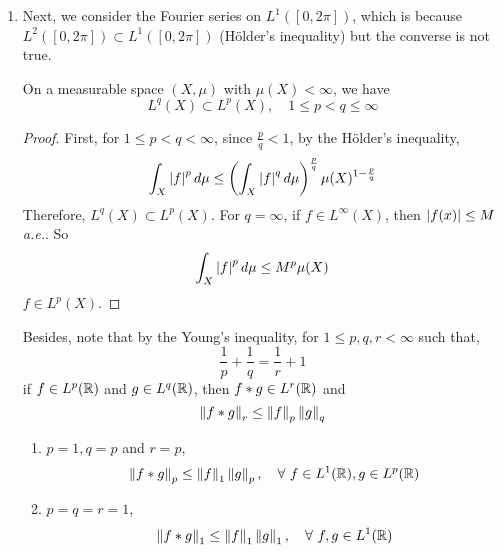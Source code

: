 \begin{enumerate}[label=\arabic*.]
	\item Next, we consider the Fourier series on $L^1([0,2\pi])$, which is because $L^2([0,2\pi])\subset L^1([0,2\pi])$ (H\"older's inequality) but the converse is not true.
	\begin{rmk}
		On a measurable space $(X,\mu)$ with $\mu(X) < \infty$, we have
		\begin{equation*}
			L^q(X) \subset L^p(X),\quad 1\leq p < q \leq \infty
		\end{equation*}
		\begin{proof}
			First, for $1\leq p < q < \infty$, since $\frac{p}{q} < 1$, by the H\"older's inequality,
			\begin{equation*}
				\int_X \left\lvert f\right\lvert^p d\mu \leq \left(\int_X \left\lvert f\right\lvert^q d\mu\right)^{\frac{p}{q}}\mu(X)^{1-\frac{p}{q}}
			\end{equation*}
			Therefore, $L^q(X) \subset L^p(X)$.
			For $q = \infty$, if $f \in L^\infty(X)$, then $\left\lvert f(x)\right\lvert \leq M$ \emph{a.e.}. So
			\begin{equation*}
				\int_X \left\lvert f\right\lvert^p d\mu \leq M^p\mu(X)
			\end{equation*}
			$f \in L^p(X)$.
		\end{proof}
	\end{rmk}
	Besides, note that by the Young's inequality, for $1 \leq p,q,r < \infty$ such that,
	\begin{equation*}
		\frac{1}{p} + \frac{1}{q} = \frac{1}{r} + 1
	\end{equation*}
	if $f \in L^p(\mathbb{R})$ and $g \in L^q(\mathbb{R})$, then $f * g \in L^r(\mathbb{R})$ and
	\begin{equation*}
		\left\lVert f * g\right\lVert_r \leq \left\lVert f\right\lVert_p\left\lVert g\right\lVert_q
	\end{equation*}
	\begin{enumerate}[label=(\arabic*)]
		\item $p = 1, q=p$ and $r = p$,
		\begin{equation*}
			\left\lVert f * g\right\lVert_p \leq \left\lVert f\right\lVert_1\left\lVert g\right\lVert_p,\quad \forall~ f \in L^1(\mathbb{R}),g \in L^p(\mathbb{R})
		\end{equation*}
		\item $p=q=r=1$,
		\begin{equation*}
			\left\lVert f * g\right\lVert_1 \leq \left\lVert f\right\lVert_1\left\lVert g\right\lVert_1,\quad \forall~ f,g \in L^1(\mathbb{R})
		\end{equation*}
	\end{enumerate}


\end{enumerate}
